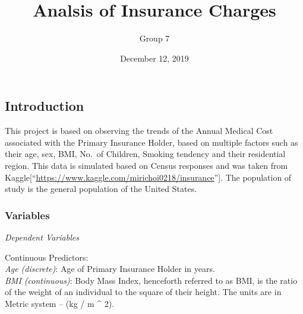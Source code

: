 \documentclass[]{article}
\title{Analsis of Insurance Charges}
\author{Group 7}
\date{December 12, 2019}
\begin{document}
\maketitle

\hypertarget{introduction}{%
\subsection{Introduction}\label{introduction}}

This project is based on observing the trends of the Annual Medical Cost
associated with the Primary Insurance Holder, based on multiple factors
such as their age, sex, BMI, No.~of Children, Smoking tendency and their
residential region. This data is simulated based on Census responses and
was taken from
Kaggle{[}``\url{https://www.kaggle.com/mirichoi0218/insurance}''{]}. The
population of study is the general population of the United States.

\hypertarget{variables}{%
\subsubsection{Variables}\label{variables}}

\emph{Dependent Variables}

Continuous Predictors:\\
\hspace*{0.333em}\hspace*{0.333em}\hspace*{0.333em}\hspace*{0.333em}\hspace*{0.333em}\hspace*{0.333em}\emph{Age
(discrete)}: Age of Primary Insurance Holder in years.\\
\hspace*{0.333em}\hspace*{0.333em}\hspace*{0.333em}\hspace*{0.333em}\hspace*{0.333em}\hspace*{0.333em}\emph{BMI
(continuous)}: Body Mass Index, henceforth referred to as BMI, is the
ratio of the weight of an individual to the square of their height. The
units are in Metric system -- (kg / m \^{} 2).
\end{document}
